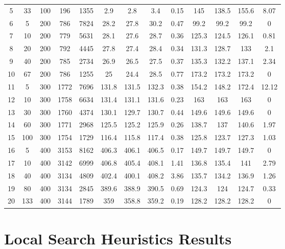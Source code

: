 \documentclass[11pt]{article}
\begin{document}
\begin{appendices}
\begin{landscape}
\begin{longtable}[c]{ccccc|cccc|cccc}
				\rowcolor[HTML]{EFEFEF} 
				5  & 33  & 100 & 196  & 1355 & 2.9   & 2.8   & 3.4   & 0.15 & 145   & 138.5 & 155.6 & 8.07  \\
				6  & 5   & 200 & 786  & 7824 & 28.2  & 27.8  & 30.2  & 0.47 & 99.2  & 99.2  & 99.2  & 0     \\
				7  & 10  & 200 & 779  & 5631 & 28.1  & 27.6  & 28.7  & 0.36 & 125.3 & 124.5 & 126.1 & 0.81  \\
				8  & 20  & 200 & 792  & 4445 & 27.8  & 27.4  & 28.4  & 0.34 & 131.3 & 128.7 & 133   & 2.1   \\
				9  & 40  & 200 & 785  & 2734 & 26.9  & 26.5  & 27.5  & 0.37 & 135.3 & 132.2 & 137.1 & 2.34  \\
				10 & 67  & 200 & 786  & 1255 & 25    & 24.4  & 28.5  & 0.77 & 173.2 & 173.2 & 173.2 & 0     \\
				\rowcolor[HTML]{EFEFEF} 
				11 & 5   & 300 & 1772 & 7696 & 131.8 & 131.5 & 132.3 & 0.38 & 154.2 & 148.2 & 172.4 & 12.12 \\
				\rowcolor[HTML]{EFEFEF} 
				12 & 10  & 300 & 1758 & 6634 & 131.4 & 131.1 & 131.6 & 0.23 & 163   & 163   & 163   & 0     \\
				\rowcolor[HTML]{EFEFEF} 
				13 & 30  & 300 & 1760 & 4374 & 130.1 & 129.7 & 130.7 & 0.44 & 149.6 & 149.6 & 149.6 & 0     \\
				\rowcolor[HTML]{EFEFEF} 
				14 & 60  & 300 & 1771 & 2968 & 125.5 & 125.2 & 125.9 & 0.26 & 138.7 & 137   & 140.6 & 1.97  \\
				\rowcolor[HTML]{EFEFEF} 
				15 & 100 & 300 & 1754 & 1729 & 116.4 & 115.8 & 117.4 & 0.38 & 125.8 & 123.7 & 127.3 & 1.03  \\
				16 & 5   & 400 & 3153 & 8162 & 406.3 & 406.1 & 406.5 & 0.17 & 149.7 & 149.7 & 149.7 & 0     \\
				17 & 10  & 400 & 3142 & 6999 & 406.8 & 405.4 & 408.1 & 1.41 & 136.8 & 135.4 & 141   & 2.79  \\
				18 & 40  & 400 & 3134 & 4809 & 402.4 & 400.1 & 408.2 & 3.86 & 135.7 & 134.2 & 136.9 & 1.26  \\
				19 & 80  & 400 & 3134 & 2845 & 389.6 & 388.9 & 390.5 & 0.69 & 124.3 & 124   & 124.7 & 0.33  \\
				20 & 133 & 400 & 3144 & 1789 & 359   & 358.8 & 359.2 & 0.19 & 128.2 & 128.2 & 128.2 & 0    
			\end{longtable}
		\end{landscape}
		
		
		\section{Local Search Heuristics Results}

\end{appendices}
\end{document}
